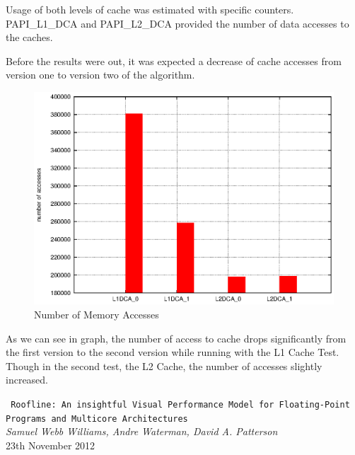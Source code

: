 \documentclass[twoside]{article}
\begin{document}
\begin{multicols}{2}
Usage of both levels of cache was estimated with specific counters. PAPI\_L1\_DCA and PAPI\_L2\_DCA provided the number of data accesses to the caches.

Before the results were out, it was expected a decrease of cache accesses from version one to version two of the algorithm.

\begin{figure}[!htp]
	\centering
	\begin{minipage}[t]{0.5\linewidth}
		\includegraphics[width=\textwidth]{images/totals.eps}
		\caption{Number of Memory Accesses \label{fig:cache3}}
	\end{minipage}
\end{figure}

As we can see in \href{fig:cache3} graph, the number of access to cache drops significantly from the first version to the second version while running with the L1 Cache Test. Though in the second test, the L2 Cache, the number of accesses slightly increased.




\begin{thebibliography}{99} %

	\texttt{\small
	Roofline: An insightful Visual Performance Model for Floating-Point Programs and Multicore Architectures}	\\
	\emph{Samuel Webb Williams, Andre Waterman, David A. Patterson}	\\
	23th November 2012


\end{thebibliography}
\end{multicols}
\end{document}
